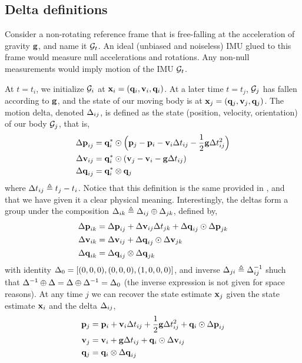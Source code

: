 \subsection{Delta definitions}

Consider a non-rotating reference frame that is free-falling at the acceleration of gravity ${\bf g}$, and name it $\mathcal{G}_t$. 
An ideal (unbiased and noiseless) IMU glued to this frame would measure null accelerations and rotations. 
Any non-null measurements would imply motion of the IMU \wrt  $\mathcal{G}_t$.

At $t=t_i$, we initialize $\mathcal{G}_i$ at ${\bf x}_i=({\bf q}_i,{\bf v}_i,{\bf q}_i)$.
At a later time $t=t_j$,  $\mathcal{G}_j$ has fallen according to ${\bf g}$, and the state of our moving body is at ${\bf x}_j=({\bf q}_j,{\bf v}_j,{\bf q}_j)$.
The motion delta, denoted $\Delta_{ij}
$, is defined as the state (position, velocity, orientation) of our body \wrt  $\mathcal{G}_j$, that is,
%
\begin{align}\label{equ:delta_definition}
\begin{split}
{\Delta{\bf p}}_{ij} &= {\bf q}_i^*\odot\Big({\bf p}_j - {\bf p}_i - {\bf v}_i\Delta t_{ij} - \frac12{\bf g}\Delta t_{ij}^2\Big) \\
{\Delta{\bf v}}_{ij} &= {\bf q}_i^*\odot({\bf v}_j - {\bf v}_i - {\bf g}\Delta t_{ij}) \\
{\Delta{\bf q}}_{ij} &= {\bf q}_i^*\otimes{\bf q}_j 
\end{split}
\end{align}
%
where $\Delta t_{ij} \triangleq t_j - t_i$. 
Notice that this definition is the same provided in \cite{LUPTON-09,forster2015imu}, and that we have given it a clear physical meaning.
Interestingly, the deltas form a group under the composition $\Delta_{ik}\triangleq\Delta_{ij}\oplus\Delta_{jk}$, defined by,
%
\begin{align} \label{equ:composition}
\begin{split}
{\Delta{\bf p}}_{ik} 
&= {\Delta{\bf p}}_{ij} + {\Delta{\bf v}}_{ij}\Delta t_{jk} + {\Delta{\bf q}}_{ij}\odot{\Delta{\bf p}}_{jk} \\
{\Delta{\bf v}}_{ik} 
&= {\Delta{\bf v}}_{ij} + {\Delta{\bf q}}_{ij}\odot{\Delta{\bf v}}_{jk} \\
{\Delta{\bf q}}_{ik} 
&= {\Delta{\bf q}}_{ij}\otimes{\Delta{\bf q}}_{jk} 
\end{split}
\end{align}
%
with identity $\Delta_0=[(0,0,0),(0,0,0),(1,0,0,0)]$, and inverse $\Delta_{ji}\triangleq\Delta_{ij}^{-1}$ shuch that $\Delta^{-1}\oplus\Delta=\Delta\oplus\Delta^{-1}=\Delta_0$ (the inverse expression is not given for space reasons).
At any time $j$ we can recover the state estimate ${\bf x}_j$ given the state estimate ${\bf x}_i$ and the delta $\Delta_{ij}$,
%
\begin{align} \label{equ:reconstruction}
\begin{split}
{\bf p}_j &= {\bf p}_i + {\bf v}_i\Delta t_{ij} + \frac12{\bf g}\Delta t_{ij}^2 + {\bf q}_i\odot{\Delta{\bf p}}_{ij} \\
{\bf v}_j &= {\bf v}_i + {\bf g}\Delta t_{ij} + {\bf q}_i\odot{\Delta{\bf v}}_{ij} \\
{\bf q}_j &= {\bf q}_i\otimes{\Delta{\bf q}}_{ij}   
\end{split}
\end{align}

